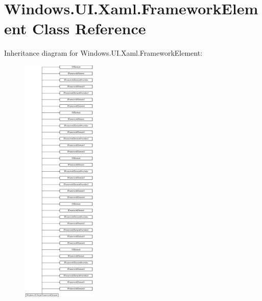 \hypertarget{class_windows_1_1_u_i_1_1_xaml_1_1_framework_element}{}\section{Windows.\+U\+I.\+Xaml.\+Framework\+Element Class Reference}
\label{class_windows_1_1_u_i_1_1_xaml_1_1_framework_element}
Inheritance diagram for Windows.\+U\+I.\+Xaml.\+Framework\+Element\+:\begin{figure}[H]
\begin{center}
\leavevmode
\includegraphics[height=12.000000cm]{class_windows_1_1_u_i_1_1_xaml_1_1_framework_element}
\end{center}
\end{figure}
